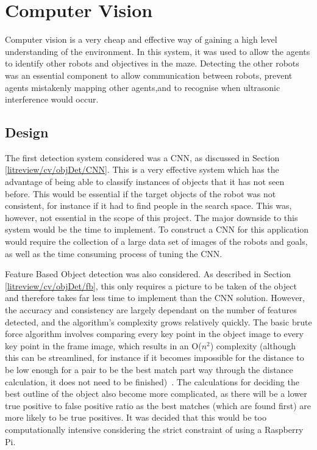 \section{Computer Vision}\label{soft/cv}
Computer vision is a very cheap and effective way of gaining a high level 
understanding of the environment. In this system, it was used to allow the agents to 
identify other robots and objectives in the maze. Detecting the other 
robots was an essential component to allow communication between robots, 
prevent agents mistakenly mapping other agents,and to recognise when 
ultrasonic interference would occur.

\subsection{Design}\label{soft/cv/design}
The first detection system considered was a CNN, as discussed in Section 
\ref{litreview/cv/objDet/CNN}. This is a very effective system which has 
the advantage of
being able to classify instances of objects that it has not
seen before. This would be essential if the target objects of
the robot was not consistent, for instance if it had to find
people in the search space. This was, however, not essential
in the scope of this project. The major downside to this
system would be the time to implement. To construct a CNN for
this application would require the collection of a large data
set of images of the robots and goals, as well as the time
consuming process of tuning the CNN.

Feature Based Object detection was also considered. As described in 
Section \ref{litreview/cv/objDet/fb}, this only requires a picture to be 
taken of the object and therefore takes far less time to
implement than the CNN solution. However, the accuracy and
consistency are largely dependant on the number of features
detected, and the algorithm's complexity grows relatively
quickly. The basic brute force algorithm involves comparing
every key point in the object image to every key point in the
frame image, which results in an O($n^2$) complexity (although
this can be streamlined, for instance if it becomes impossible
for the distance to be low enough for a pair to be the best
match part way through the distance calculation, it does not
need to be finished)~\cite{opencv_library}. The calculations for deciding the best
outline of the object also become more complicated, as there
will be a lower true positive to false positive ratio as the
best matches (which are found first) are more likely to be
true positives. It was decided that this would be too
computationally intensive considering the strict constraint of
using a Raspberry Pi.

